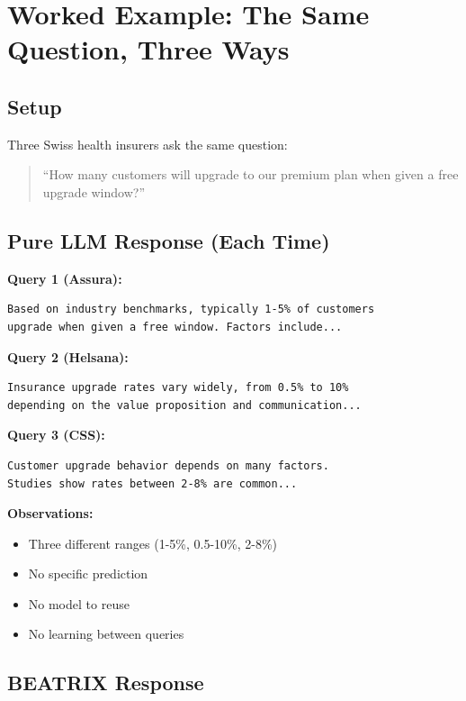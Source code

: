 \section{Worked Example: The Same Question, Three Ways}
\label{sec:bx-example}

\subsection{Setup}

Three Swiss health insurers ask the same question:
\begin{quote}
``How many customers will upgrade to our premium plan when given a free upgrade window?''
\end{quote}

\subsection{Pure LLM Response (Each Time)}

\textbf{Query 1 (Assura):}
\begin{verbatim}
Based on industry benchmarks, typically 1-5% of customers
upgrade when given a free window. Factors include...
\end{verbatim}

\textbf{Query 2 (Helsana):}
\begin{verbatim}
Insurance upgrade rates vary widely, from 0.5% to 10%
depending on the value proposition and communication...
\end{verbatim}

\textbf{Query 3 (CSS):}
\begin{verbatim}
Customer upgrade behavior depends on many factors.
Studies show rates between 2-8% are common...
\end{verbatim}

\textbf{Observations:}
\begin{itemize}[nosep]
    \item Three different ranges (1-5\%, 0.5-10\%, 2-8\%)
    \item No specific prediction
    \item No model to reuse
    \item No learning between queries
\end{itemize}

\subsection{BEATRIX Response}

